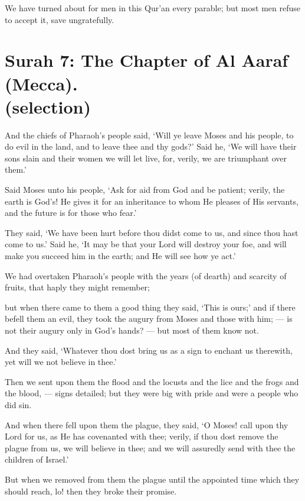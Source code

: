 \documentclass[fontsize=14pt, letterpaper, notitlepage, openany, DIV=12]{scrbook} %
\begin{document}
\noindent[17:89]
We have turned about for men in this Qur'an every parable; but most men refuse to
accept it, save ungratefully.


\section[Surah 7: The Chapter of Al Aaraf (Mecca).]{Surah 7: The Chapter of Al Aaraf (Mecca).\\ (selection)}


\noindent[7:127]
And the chiefs of Pharaoh's people said, `Will ye leave Moses and his people, to do evil
in the land, and to leave thee and thy gods?' Said he, `We will have their sons slain and their
women we will let live, for, verily, we are triumphant over them.'

\noindent[7:128]
Said Moses unto his people, `Ask for aid from God and be patient; verily, the earth is
God's! He gives it for an inheritance to whom He pleases of His servants, and the future is for
those who fear.'

\noindent[7:129]
They said, `We have been hurt before thou didst come to us, and since thou hast come to
us.' Said he, `It may be that your Lord will destroy your foe, and will make you succeed him in
the earth; and He will see how ye act.'

\noindent[7:130]
We had overtaken Pharaoh's people with the years (of dearth) and scarcity of fruits, that
haply they might remember;

\noindent[7:131]
but when there came to them a good thing they said, `This is ours;' and if there befell
them an evil, they took the augury from Moses and those with him; --- is not their augury only in
God's hands? --- but most of them know not.

\noindent[7:132]
And they said, `Whatever thou dost bring us as a sign to enchant us therewith, yet will we
not believe in thee.'

\noindent[7:133]
Then we sent upon them the flood and the locusts and the lice and the frogs and the
blood, --- signs detailed; but they were big with pride and were a people who did sin.

\noindent[7:134]
And when there fell upon them the plague, they said, `O Moses! call upon thy Lord for
us, as He has covenanted with thee; verily, if thou dost remove the plague from us, we will
believe in thee; and we will assuredly send with thee the children of Israel.'

\noindent[7:135]
But when we removed from them the plague until the appointed time which they should
reach, lo! then they broke their promise.
\end{document}

